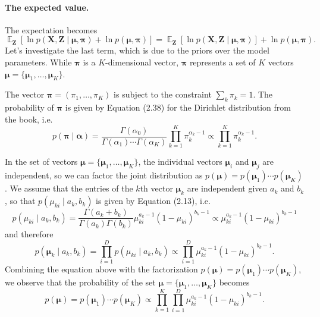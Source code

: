 \documentclass[12pt, a4paper]{article}
\newcommand{\vect}[1]{\bm{#1}}
\DeclareMathOperator{\E}{\mathbb{E}}
\begin{document}
\paragraph{The expected value.} The expectation becomes
\begin{equation*}
	\E_{\vect{Z}} \left[ \ln p (\vect{X}, \vect{Z} \mid \vect{\mu}, \vect{\pi}) + \ln p(\vect{\mu}, \vect{\pi}) \right]
	=
	\E_{\vect{Z}} \left[ \ln p (\vect{X}, \vect{Z} \mid \vect{\mu}, \vect{\pi})  \right]
	+
	\ln p(\vect{\mu}, \vect{\pi}).
\end{equation*}
Let's investigate the last term, which is due to the priors over the model parameters.
While $\vect{\pi}$ is a $K$-dimensional vector, $\vect{\pi}$ represents a set of $K$ vectors $\vect{\mu} = \{ \vect{\mu}_1, \ldots, \vect{\mu}_K \}$.

The vector $\vect{\pi} = ( \pi_1, \ldots, \pi_K )$ is subject to the constraint $\sum_k \pi_k = 1$.
The probability of $\vect{\pi}$ is given by Equation (2.38) for the Dirichlet distribution from the book, i.e.
\begin{equation}
\label{eqn:ch9_prob18_prior_pi}
	p(\vect{\pi} \mid \vect{\alpha}) = \frac{\Gamma(\alpha_0)}{\Gamma(\alpha_1) \cdots \Gamma(\alpha_K)}
	\prod_{k=1}^{K} \pi_k^{\alpha_k - 1}
	\propto \prod_{k=1}^{K} \pi_k^{\alpha_k - 1}.
\end{equation}

In the set of vectors $\vect{\mu} = \{ \vect{\mu}_1, \ldots, \vect{\mu}_K \}$, the individual vectors $\vect{\mu}_i$ and $\vect{\mu}_j$ are independent, so we can factor the joint distribution as
$p(\vect{\mu}) = p(\vect{\mu}_1) \cdots p(\vect{\mu}_K)$.
We assume that the entries of the $k$th vector $\vect{\mu}_k$ are independent given $a_k$ and $b_k$, so that $p(\mu_{ki} \mid a_k, b_k)$ is given by Equation (2.13), i.e.
\begin{equation*}
	p(\mu_{ki} \mid a_k, b_k) = 
	\frac{\Gamma(a_k + b_k)}{\Gamma(a_k ) \Gamma( b_k)}
	\mu_{ki}^{a_k-1}(1 - \mu_{ki})^{b_k-1}
	\propto \mu_{ki}^{a_k-1}(1 - \mu_{ki})^{b_k-1}
\end{equation*}
and therefore
\begin{equation*}
	p(\vect{\mu}_k \mid a_k, b_k) = 
	\prod_{i=1}^{D}
	p( \mu_{ki} \mid a_k, b_k)
	\propto
	\prod_{i=1}^{D}
	\mu_{ki}^{a_k-1}(1 - \mu_{ki})^{b_k-1}.
\end{equation*}
Combining the equation above with the factorization $p(\vect{\mu}) = p(\vect{\mu}_1) \cdots p(\vect{\mu}_K)$, we observe that the probability of the set $\vect{\mu} = \{ \vect{\mu}_1, \ldots, \vect{\mu}_K \}$ becomes
\begin{equation}
	\label{eqn:ch9_prob18_prior_mu}
	p(\vect{\mu}) = p(\vect{\mu}_1) \cdots p(\vect{\mu}_K)
	\propto
	\prod_{k=1}^{K}
	\prod_{i=1}^{D}
	\mu_{ki}^{a_k-1}(1 - \mu_{ki})^{b_k-1}.
\end{equation}
\end{document}
